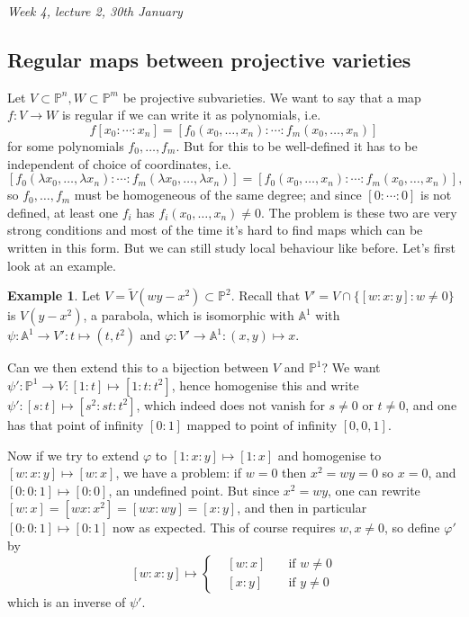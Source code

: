\documentclass{article}
\newcommand{\A}{\mathbb{A}}
\newcommand{\p}{\mathbb{P}}
\theoremstyle{definition}
\newtheorem{example}[defn]{Example}
\begin{document}
\begin{flushright}
\textit{Week 4, lecture 2, 30th January}
\end{flushright}

\subsection{Regular maps between projective varieties}
Let $V\subset\p^n,W\subset\p^m$ be projective subvarieties. We want to say that a map $f:V\rightarrow W$ is regular if we can write it as polynomials, i.e.
\[
f[x_0:\cdots:x_n]=[f_0(x_0,\ldots,x_n):\cdots:f_m(x_0,\ldots,x_n)]
\]
for some polynomials $f_0,\ldots,f_m$. But for this to be well-defined it has to be independent of choice of coordinates, i.e.
\[
[f_0(\lambda x_0,\ldots,\lambda x_n):\cdots:f_m(\lambda x_0,\ldots,\lambda x_n)]=[f_0(x_0,\ldots,x_n):\cdots:f_m(x_0,\ldots,x_n)],
\]
so $f_0,\ldots,f_m$ must be homogeneous of the same degree; and since $[0:\cdots:0]$ is not defined, at least one $f_i$ has $f_i(x_0,\ldots,x_n)\neq 0$. The problem is these two are very strong conditions and most of the time it's hard to find maps which can be written in this form. But we can still study local behaviour like before. Let's first look at an example.

\begin{example}
\label{example:regmapquasiproj}
Let $V=\widetilde V(wy-x^2)\subset\p^2$. Recall that $	V'=V\cap\{[w:x:y]:w\neq 0\}$ is $V(y-x^2)$, a parabola, which is isomorphic with $\A^1$ with $\psi:\A^1\rightarrow V':t\mapsto (t,t^2)$ and $\varphi:V'\rightarrow\A^1:(x,y)\mapsto x$.

Can we then extend this to a bijection between $V$ and $\p^1$? We want $\psi':\p^1\rightarrow V:[1:t]\mapsto[1:t:t^2]$, hence homogenise this and write $\psi':[s:t]\mapsto[s^2:st:t^2]$, which indeed does not vanish for $s\neq 0$ or $t\neq 0$, and one has that point of infinity $[0:1]$ mapped to point of infinity $[0,0,1]$.

Now if we try to extend $\varphi$ to $[1:x:y]\mapsto [1:x]$ and homogenise to $[w:x:y]\mapsto [w:x]$, we have a problem: if $w=0$ then $x^2=wy=0$ so $x=0$, and $[0:0:1]\mapsto [0:0]$, an undefined point. But since $x^2=wy$, one can rewrite $[w:x]=[wx:x^2]=[wx:wy]=[x:y]$, and then in particular $[0:0:1]\mapsto [0:1]$ now as expected. This of course requires $w,x\neq 0$, so define $\varphi'$ by
\[
[w:x:y]\mapsto\left\{
\begin{aligned}
&[w:x] \quad&\text{if }w\neq 0 \\
&[x:y] \quad&\text{if }y\neq 0
\end{aligned}
\right.
\]
which is an inverse of $\psi'$.
\end{example}
\end{document}
